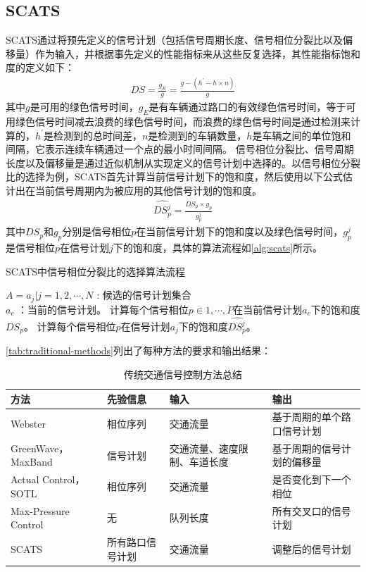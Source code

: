 \subsection{SCATS}
SCATS通过将预先定义的信号计划（包括信号周期长度、信号相位分裂比以及偏移量）作为输入，并根据事先定义的性能指标来从这些反复选择，其性能指标饱和度的定义如下：
\begin{align}
    D S=\frac{g_E}{g}=\frac{g-\left(h^{\prime}-h \times n\right)}{g}
\end{align}
其中$g$是可用的绿色信号时间，$g_E$是有车辆通过路口的有效绿色信号时间，等于可用绿色信号时间减去浪费的绿色信号时间，而浪费的绿色信号时间是通过检测来计算的，$h^{\prime}$是检测到的总时间差，$n$是检测到的车辆数量，$h$是车辆之间的单位饱和间隔，它表示连续车辆通过一个点的最小时间间隔。
信号相位分裂比、信号周期长度以及偏移量是通过近似机制从实现定义的信号计划中选择的。以信号相位分裂比的选择为例，SCATS首先计算当前信号计划下的饱和度，然后使用以下公式估计出在当前信号周期内为被应用的其他信号计划的饱和度。
\begin{align}
    \hat{D S^j_p} = \frac{D S_p \times g_p}{g_p^j}
\end{align}
其中$D S_p\text{和} g_p$分别是信号相位$p$在当前信号计划下的饱和度以及绿色信号时间，$g^j_p$是信号相位$p$在信号计划$j$下的饱和度，具体的算法流程如\autoref{alg:scats}所示。
\begin{breakablealgorithm}
    \caption{SCATS中信号相位分裂比的选择算法流程}
    \label{alg:scats}
    \begin{algorithmic}[1] %
        \Require 
        $A={a_j|j=1,2,\cdots,N}$ : 候选的信号计划集合\\
        $a_c$ ：当前的信号计划。 
            \State 计算每个信号相位$p\in{1,\cdots, P}$在当前信号计划$a_c$下的饱和度$D S_{p}$。
        \EndFor
            \State 计算每个信号相位$p$在信号计划$a_j$下的饱和度$\hat{D S^j_p}$。
        \EndFor
    \end{algorithmic}  
\end{breakablealgorithm}  

\autoref{tab:traditional-methods}列出了每种方法的要求和输出结果：
\begin{table}[htb]
    \caption{传统交通信号控制方法总结\label{tab:traditional-methods}}
    \begin{tabular}{llll}
      \toprule
      方法 & 先验信息 & 输入 & 输出 \\
      \midrule
      Webster & 相位序列 & 交通流量 & 基于周期的单个路口信号计划 \\
      GreenWave，MaxBand & 信号计划 & 交通流量、速度限制、车道长度 & 基于周期的信号计划的偏移量 \\
      Actual Control， SOTL & 相位序列& 交通流量 & 是否变化到下一个相位\\
      Max-Pressure Control & 无 & 队列长度 & 所有交叉口的信号计划\\
      SCATS & 所有路口信号计划 & 交通流量 & 调整后的信号计划\\
      \bottomrule
    \end{tabular}
\end{table}

